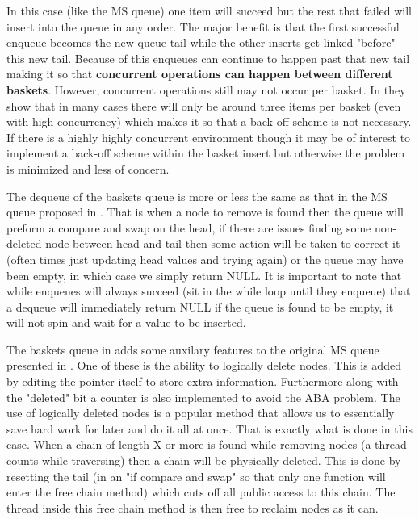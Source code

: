 \documentclass[conference]{IEEEtran}
\begin{document}
In this case (like the MS queue) one item will succeed but the rest that failed will insert into the queue in any order.  The major benefit is that the first successful enqueue becomes the new queue tail while the other inserts get linked "before" this new tail.  Because of this enqueues can continue to happen past that new tail making it so that \textbf{concurrent operations can happen between different baskets}.  However, concurrent operations still may not occur per basket.  In \cite{baskets} they show that in many cases there will only be around three items per basket (even with high concurrency) which makes it so that a back-off scheme is not necessary.  If there is a highly highly concurrent environment though it may be of interest to implement a back-off scheme within the basket insert but otherwise the problem is minimized and less of concern. \break

The dequeue of the baskets queue is more or less the same as that in the MS queue proposed in \cite{ms}.  That is when a node to remove is found then the queue will preform a compare and swap on the head, if there are issues finding some non-deleted node between head and tail then some action will be taken to correct it (often times just updating head values and trying again) or the queue may have been empty, in which case we simply return NULL.  It is important to note that while enqueues will always succeed (sit in the while loop until they enqueue) that a dequeue will immediately return NULL if the queue is found to be empty, it will not spin and wait for a value to be inserted.\break

The baskets queue in \cite{baskets} adds some auxilary features to the original MS queue presented in \cite{ms}.  One of these is the ability to logically delete nodes.  This is added by editing the pointer itself to store extra information.  Furthermore along with the "deleted" bit a counter is also implemented to avoid the ABA problem.  The use of logically deleted nodes is a popular method that allows us to essentially save hard work for later and do it all at once.  That is exactly what is done in this case.  When a chain of length X or more is found while removing nodes (a thread counts while traversing) then a chain will be physically deleted.  This is done by resetting the tail (in an "if compare and swap" so that only one function will enter the free chain method) which cuts off all public access to this chain.  The thread inside this free chain method is then free to reclaim nodes as it can.\break
\end{document}
